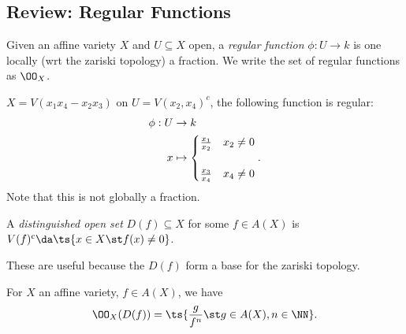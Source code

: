 \hypertarget{review-regular-functions}{%
\subsection{Review: Regular Functions}\label{review-regular-functions}}

Given an affine variety \(X\) and \(U\subseteq X\) open, a \emph{regular
function} \(\phi: U\to k\) is one locally (wrt the zariski topology) a
fraction. We write the set of regular functions as \(\OO_X\).

\begin{example}

\(X = V(x_1 x_4 - x_2 x_3)\) on \(U = V(x_2, x_4)^c\), the following
function is regular:
\begin{align*}  
\phi: U &\to k \\
x &\mapsto 
\begin{cases}
{x_1\over x_2} & x_2 \neq 0 \\ \\
{x_3 \over x_4} & x_4 \neq 0
\end{cases}
.\end{align*} Note that this is not globally a fraction.

\end{example}

\begin{definition}

A \emph{distinguished open set} \(D(f) \subseteq X\) for some
\(f\in A(X)\) is \(V(f)^c \da \ts{x\in X \st f(x) \neq 0}\).

\end{definition}

These are useful because the \(D(f)\) form a base for the zariski
topology.

\begin{proposition}[?]

For \(X\) an affine variety, \(f\in A(X)\), we have
\begin{align*} 
\OO_X(D(f)) = \ts{ {g\over f^n} \st g\in A(X), n\in \NN}
.\end{align*}

\end{proposition}

